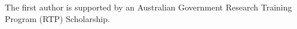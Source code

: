 \documentclass[format=acmsmall, review=false, screen=false]{acmart}
\begin{document}
\begin{acks}
The first author is supported by an Australian Government Research Training Program (RTP) Scholarship.
\end{acks}



\end{document}
